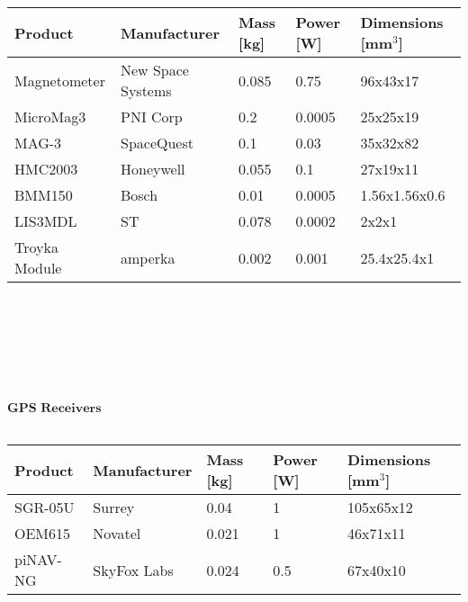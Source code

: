       \begin{tabular}{p{3cm}p{3cm}p{2cm}p{2cm}p{2cm}} \toprule
      	Product & Manufacturer & Mass [kg] & Power [W]& Dimensions [mm$^{3}$]\\ \midrule
      	
      			Magnetometer & New Space Systems & 0.085 & 0.75 & 96x43x17 \\
      	
      			MicroMag3 & PNI Corp  & 0.2 & 0.0005 & 25x25x19 \\
      			
      			MAG-3 & SpaceQuest  & 0.1 & 0.03 & 35x32x82  \\
      		
      			HMC2003 & Honeywell & 0.055 & 0.1 & 27x19x11 \\
      			
      			BMM150 & Bosch & 0.01 & 0.0005 & 1.56x1.56x0.6 \\
      		
      			LIS3MDL & ST & 0.078 & 0.0002 & 2x2x1 \\
      			
      			Troyka Module & amperka & 0.002 & 0.001 & 25.4x25.4x1  \\ \bottomrule
      \end{tabular}\\ \\ \\ \\ \\ \\ 
      
       $\textbf{GPS Receivers}$\\ \\
	      \begin{tabular}{p{3cm}p{3cm}p{2cm}p{2cm}p{2cm}} \toprule
       	Product & Manufacturer & Mass [kg] & Power [W]& Dimensions [mm$^{3}$]\\ \midrule
       	
		       SGR-05U & Surrey & 0.04 & 1 & 105x65x12 \\
		       
		       OEM615 & Novatel & 0.021 & 1 & 46x71x11 \\
		       
		       piNAV-NG  & SkyFox Labs & 0.024 & 0.5 & 67x40x10 \\ \bottomrule
       \end{tabular}\\ \\ \\ \\
 
